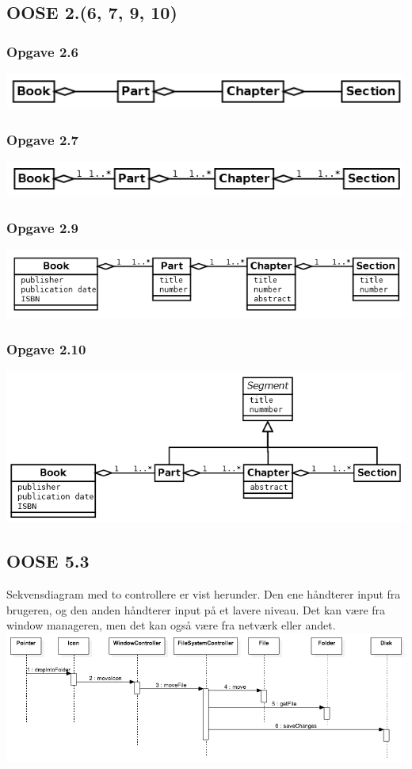 \documentclass[12pt]{article}
\begin{document}
\subsection{OOSE 2.(6, 7, 9, 10)}
\subsubsection*{Opgave 2.6}
\includegraphics[scale=0.8]{diagrammer/E2_6} \\
\subsubsection*{Opgave 2.7}
\includegraphics[scale=0.8]{diagrammer/E2_7} \\
\subsubsection*{Opgave 2.9}
\includegraphics[scale=0.8]{diagrammer/E2_9} \\
\subsubsection*{Opgave 2.10}
\includegraphics[scale=0.8]{diagrammer/E2_10} \\
\subsection{OOSE 5.3}
Sekvensdiagram med to controllere er vist herunder. Den ene håndterer input fra brugeren, og den anden håndterer input på et lavere niveau. Det kan være fra window manageren, men det kan også være fra netværk eller andet. \\
\includegraphics[width=1.0\textwidth]{diagrammer/SD.png}
\end{document}
